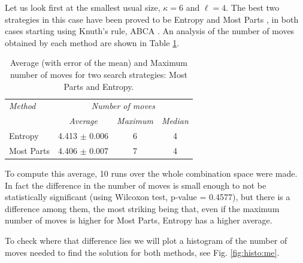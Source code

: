 \documentclass[preprint,12pt]{elsarticle}
\begin{document}
Let us look first at the smallest usual size, $\kappa=6$ and
$\ell=4$. The best two strategies in this case have been proved 
to be Entropy and Most Parts \cite{nicso,Berghman20091880}, in both cases
starting using Knuth's rule, ABCA \cite{Knuth}. An analysis of the number of moves obtained by each method
are shown in Table \ref{tab:me}.
\begin{table}[htb!]
\caption{Average (with error of the mean) and Maximum number of moves for two search strategies: Most Parts
  and Entropy. \label{tab:me}}
  \centering\smallskip
\begin{tabular}{|l|c|c|c|}
\hline
\emph{Method} & \multicolumn{3}{c|}{\emph{Number of moves}}\\
 & \emph{Average} & \emph{Maximum} & \emph{Median} \\
\hline
Entropy & 4.413 $\pm$ 0.006 & 6 & 4 \\
Most Parts & 4.406 $\pm$ 0.007 & 7 & 4 \\
\hline
\end{tabular}
\end{table}
%
To compute this average, 10 runs over the whole combination space were
made. In fact the difference in the number of moves is small enough to not
be statistically significant (using Wilcoxon test, p-value = 0.4577), 
but there is a
difference among them, the most striking being that, even if the
maximum number of moves is higher for Most Parts, Entropy has a higher
average. 

To check where that difference lies we will plot a
histogram of the number of moves needed to find the solution for both
methods, see Fig. \ref{fig:histo:me}. 
\end{document}
